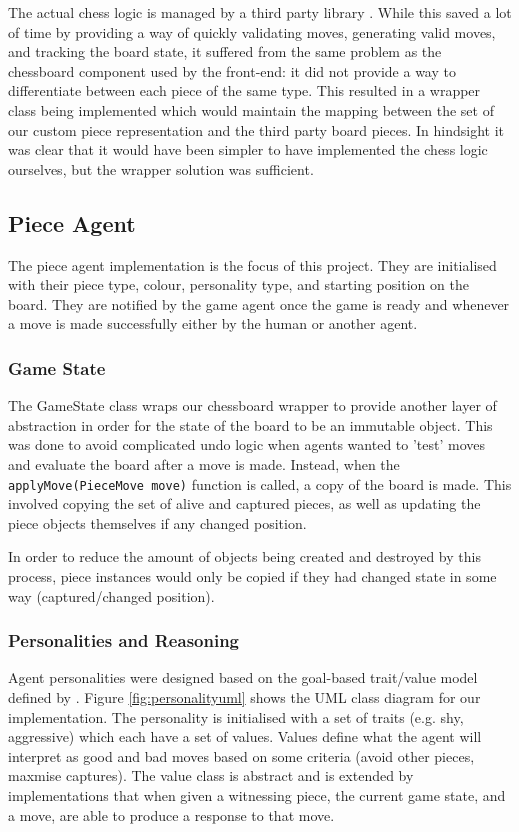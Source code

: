 \documentclass[conference]{IEEEtran}
\begin{document}
The actual chess logic is managed by a third party library \cite{chesslib}. While this saved a lot of time by providing a way of quickly validating moves, generating valid moves, and tracking the board state, it suffered from the same problem as the chessboard component used by the front-end: it did not provide a way to differentiate between each piece of the same type. This resulted in a wrapper class being implemented which would maintain the mapping between the set of our custom piece representation and the third party board pieces. In hindsight it was clear that it would have been simpler to have implemented the chess logic ourselves, but the wrapper solution was sufficient.

\subsection{Piece Agent}

The piece agent implementation is the focus of this project. They are initialised with their piece type, colour, personality type, and starting position on the board. They are notified by the game agent once the game is ready and whenever a move is made successfully either by the human or another agent. 

\subsubsection{Game State}

The GameState class wraps our chessboard wrapper to provide another layer of abstraction in order for the state of the board to be an immutable object. This was done to avoid complicated undo logic when agents wanted to 'test' moves and evaluate the board after a move is made. Instead, when the \lstinline{applyMove(PieceMove move)} function is called, a copy of the board is made. This involved copying the set of alive and captured pieces, as well as updating the piece objects themselves if any changed position. 

In order to reduce the amount of objects being created and destroyed by this process, piece instances would only be copied if they had changed state in some way (captured/changed position). 

\subsubsection{Personalities and Reasoning}

Agent personalities were designed based on the goal-based trait/value model defined by \cite{hetrogenousagents}. Figure \ref{fig:personalityuml} shows the UML class diagram for our implementation. The personality is initialised with a set of traits (e.g. shy, aggressive) which each have a set of values. Values define what the agent will interpret as good and bad moves based on some criteria (avoid other pieces, maxmise captures). The value class is abstract and is extended by implementations that when given a witnessing piece, the current game state, and a move, are able to produce a response to that move.
\end{document}
